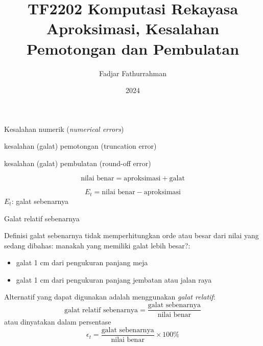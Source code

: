 

\title{TF2202 Komputasi Rekayasa\\
Aproksimasi, Kesalahan Pemotongan dan Pembulatan}
\author{Fadjar Fathurrahman}
\date{2024}



\frame{\titlepage}

\begin{frame}{Kesalahan numerik (\textit{numerical errors})}

kesalahan (galat) pemotongan (truncation error)

kesalahan (galat) pembulatan (round-off error)

\begin{equation*}
\text{nilai benar} = \text{aproksimasi} + \text{galat}
\end{equation*}

\begin{equation*}
E_{t} = \text{nilai benar} - \text{aproksimasi}
\end{equation*}
$E_t$: galat sebenarnya

\end{frame}


\begin{frame}{Galat relatif sebenarnya}

Definisi galat sebenarnya tidak memperhitungkan orde atau besar
dari nilai yang sedang dibahas: manakah yang memiliki galat lebih
besar?:
\begin{itemize}\tightlist
\item galat 1 cm dari pengukuran panjang meja
\item galat 1 cm dari pengukuran panjang jembatan atau jalan raya
\end{itemize}

Alternatif yang dapat digunakan
adalah menggunakan \textit{galat relatif}:
\begin{equation*}
\text{galat relatif sebenarnya} = \frac{\text{galat sebenarnya}}{\text{nilai benar}}
\end{equation*}
atau dinyatakan dalam persentase
\begin{equation*}
\epsilon_{t} = \frac{\text{galat sebenarnya}}{\text{nilai benar}} \times 100\%
\end{equation*}

\end{frame}



